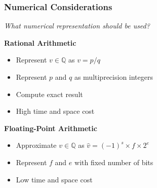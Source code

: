 \documentclass[t,pdf]{beamer}
\newcommand{\bitem}{\item[$\bullet$]}
\newcommand{\approximate}[1]{\hat{#1}}
\newcommand{\approxv}{\approximate{v}}
\begin{document}
\begin{frame}
  \frametitle{Numerical Considerations}

\begin{center}
  \Large \emph{What numerical representation should be used?}
\end{center}

\bigskip
\begin{minipage}[t]{0.48\textwidth}
{\bf Rational Arithmetic}
\begin{itemize}
  \bitem Represent $v \in \mathbb{Q}$ as $v = p/q$
  \bitem Represent $p$ and $q$ as multiprecision integers
  \bitem Compute exact result
  \bitem High time and space cost
\end{itemize}
\end{minipage}
\begin{minipage}[t]{0.48\textwidth}
{\bf Floating-Point Arithmetic}
\begin{itemize}
  \bitem Approximate $v \in \mathbb{Q}$ as $\approxv = (-1)^s \times f \times 2^{e}$
  \bitem Represent $f$ and $e$ with fixed number of bits
  \bitem Low time and space cost
\end{itemize}
\end{minipage}

\bigskip
{}

\end{frame}
\end{document}
